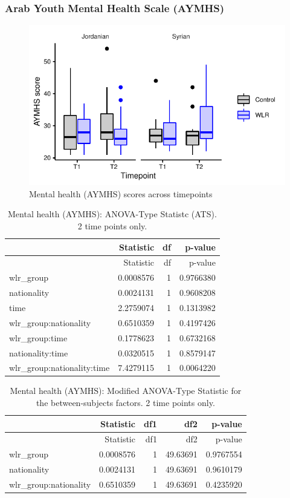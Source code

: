 \documentclass[]{article}
\begin{document}
\newpage

\hypertarget{arab-youth-mental-health-scale-aymhs-1}{%
\subsubsection{Arab Youth Mental Health Scale
(AYMHS)}\label{arab-youth-mental-health-scale-aymhs-1}}

\begin{figure}[H]

{\centering \includegraphics{WLR-analyses-report_files/figure-latex/unnamed-chunk-37-1} 

}

\caption{Mental health (AYMHS) scores across timepoints}\label{fig:unnamed-chunk-37}
\end{figure}

\begin{longtable}[]{@{}lrrr@{}}
\caption{Mental health (AYMHS): ANOVA-Type Statistc (ATS). 2 time points
only.}\tabularnewline
\toprule
& Statistic & df & p-value\tabularnewline
\midrule
\endfirsthead
\toprule
& Statistic & df & p-value\tabularnewline
\midrule
\endhead
wlr\_group & 0.0008576 & 1 & 0.9766380\tabularnewline
nationality & 0.0024131 & 1 & 0.9608208\tabularnewline
time & 2.2759074 & 1 & 0.1313982\tabularnewline
wlr\_group:nationality & 0.6510359 & 1 & 0.4197426\tabularnewline
wlr\_group:time & 0.1778623 & 1 & 0.6732168\tabularnewline
nationality:time & 0.0320515 & 1 & 0.8579147\tabularnewline
wlr\_group:nationality:time & 7.4279115 & 1 & 0.0064220\tabularnewline
\bottomrule
\end{longtable}

\begin{longtable}[]{@{}lrrrr@{}}
\caption{Mental health (AYMHS): Modified ANOVA-Type Statistic for the
between-subjects factors. 2 time points only.}\tabularnewline
\toprule
& Statistic & df1 & df2 & p-value\tabularnewline
\midrule
\endfirsthead
\toprule
& Statistic & df1 & df2 & p-value\tabularnewline
\midrule
\endhead
wlr\_group & 0.0008576 & 1 & 49.63691 & 0.9767554\tabularnewline
nationality & 0.0024131 & 1 & 49.63691 & 0.9610179\tabularnewline
wlr\_group:nationality & 0.6510359 & 1 & 49.63691 &
0.4235920\tabularnewline
\bottomrule
\end{longtable}
\end{document}
